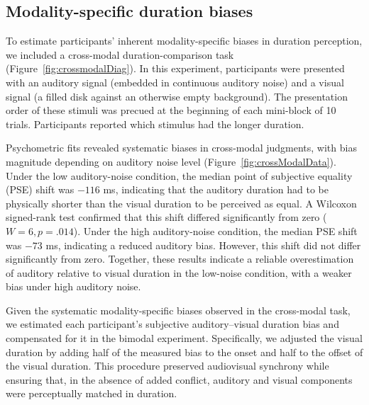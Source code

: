 \documentclass{jov}
\begin{document}
\subsection{Modality-specific duration biases}

To estimate participants' inherent modality-specific biases in duration perception, we included a cross-modal duration-comparison task (Figure~\ref{fig:crossmodalDiag}). In this experiment, participants were presented with an auditory signal (embedded in continuous auditory noise) and a visual signal (a filled disk against an otherwise empty background). The presentation order of these stimuli was precued at the beginning of each mini-block of 10 trials. Participants reported which stimulus had the longer duration.

Psychometric fits revealed systematic biases in cross-modal judgments, with bias magnitude depending on auditory noise level (Figure~\ref{fig:crossModalData}). Under the low auditory-noise condition, the median point of subjective equality (PSE) shift was $-116$ ms, indicating that the auditory duration had to be physically shorter than the visual duration to be perceived as equal. A Wilcoxon signed-rank test confirmed that this shift differed significantly from zero ($W = 6, p = .014$). Under the high auditory-noise condition, the median PSE shift was $-73$ ms, indicating a reduced auditory bias. However, this shift did not differ significantly from zero. Together, these results indicate a reliable overestimation of auditory relative to visual duration in the low-noise condition, with a weaker bias under high auditory noise.

Given the systematic modality-specific biases observed in the cross-modal task, we estimated each participant's subjective auditory--visual duration bias and compensated for it in the bimodal experiment. Specifically, we adjusted the visual duration by adding half of the measured bias to the onset and half to the offset of the visual duration. This procedure preserved audiovisual synchrony while ensuring that, in the absence of added conflict, auditory and visual components were perceptually matched in duration. 
\end{document}
